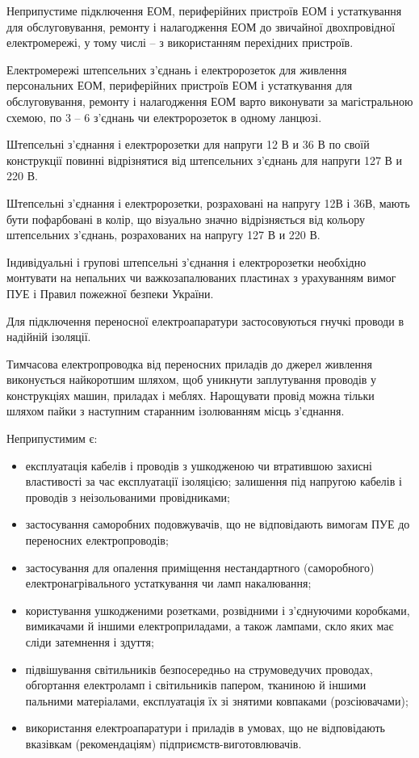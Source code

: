 \documentclass[simple,a4paper,14pt,ukrainian,utf8]{eskdtext}
\begin{document}
\begin{appendices}
                Неприпустиме підключення ЕОМ, периферійних пристроїв ЕОМ і устаткування для обслуговування, ремонту і налагодження ЕОМ до звичайної двохпровідної електромережі, у тому числі -- з використанням перехідних пристроїв.

                Електромережі штепсельних з'єднань і електророзеток для живлення персональних ЕОМ, периферійних пристроїв ЕОМ і устаткування для обслуговування, ремонту і налагодження ЕОМ варто виконувати за магістральною схемою, по 3 -- 6 з'єднань чи електророзеток в одному ланцюзі.

                Штепсельні з'єднання і електророзетки для напруги 12 В и 36 В по своїй конструкції повинні відрізнятися від штепсельних з'єднань для напруги 127 В и 220 В.

                Штепсельні з'єднання і електророзетки, розраховані на напругу 12В і 36В, мають бути пофарбовані в колір, що візуально значно відрізняється від кольору штепсельних з'єднань, розрахованих на напругу 127 В и 220 В.

                Індивідуальні і групові штепсельні з'єднання і електророзетки необхідно монтувати на непальних чи важкозапалюваних пластинах з урахуванням вимог ПУЕ і Правил пожежної безпеки України.

                Для підключення переносної електроапаратури застосовуються гнучкі проводи в надійній ізоляції.

                Тимчасова електропроводка від переносних приладів до джерел живлення виконується  найкоротшим шляхом, щоб уникнути заплутування проводів у конструкціях машин, приладах і меблях. Нарощувати провід можна тільки шляхом пайки з наступним старанним ізолюванням місць з'єднання.

                Неприпустимим є:

                \begin{itemize}
                    \item експлуатація кабелів і проводів з ушкодженою чи втратившою захисні властивості за час експлуатації ізоляцією; залишення під напругою кабелів і проводів з неізольованими провідниками;
                    \item застосування саморобних подовжувачів, що не відповідають вимогам ПУЕ до переносних електропроводів;
                    \item застосування для опалення приміщення нестандартного (саморобного) електронагрівального устаткування чи ламп накалювання;
                    \item користування ушкодженими розетками, розвідними і з'єднуючими коробками, вимикачами й іншими електроприладами, а також лампами, скло яких має сліди затемнення і здуття;
                    \item підвішування світильників безпосередньо на струмоведучих проводах, обгортання електроламп і світильників папером, тканиною й іншими пальними матеріалами, експлуатація їх зі знятими ковпаками (розсіювачами);
                    \item використання електроапаратури і приладів в умовах, що не відповідають вказівкам (рекомендаціям) підприємств-виготовлювачів.
                \end{itemize}


\end{appendices}
\end{document}
